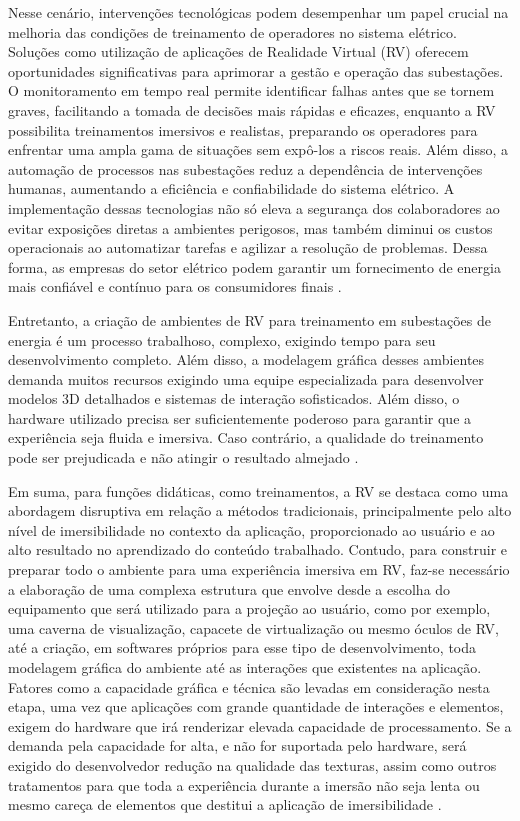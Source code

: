 Nesse cenário, intervenções tecnológicas podem desempenhar um papel crucial na melhoria das condições de treinamento de operadores no sistema elétrico. Soluções como utilização de aplicações de Realidade Virtual (RV) oferecem oportunidades significativas para aprimorar a gestão e operação das subestações. O monitoramento em tempo real permite identificar falhas antes que se tornem graves, facilitando a tomada de decisões mais rápidas e eficazes, enquanto a RV possibilita treinamentos imersivos e realistas, preparando os operadores para enfrentar uma ampla gama de situações sem expô-los a riscos reais. Além disso, a automação de processos nas subestações reduz a dependência de intervenções humanas, aumentando a eficiência e confiabilidade do sistema elétrico. A implementação dessas tecnologias não só eleva a segurança dos colaboradores ao evitar exposições diretas a ambientes perigosos, mas também diminui os custos operacionais ao automatizar tarefas e agilizar a resolução de problemas. Dessa forma, as empresas do setor elétrico podem garantir um fornecimento de energia mais confiável e contínuo para os consumidores finais \cite{zhou2016big}.

Entretanto, a criação de ambientes de RV para treinamento em subestações de energia é um processo trabalhoso, complexo, exigindo tempo para seu desenvolvimento completo. Além disso, a modelagem gráfica desses ambientes demanda muitos recursos exigindo uma equipe especializada para desenvolver modelos 3D detalhados e sistemas de interação sofisticados. Além disso, o hardware utilizado precisa ser suficientemente poderoso para garantir que a experiência seja fluida e imersiva. Caso contrário, a qualidade do treinamento pode ser prejudicada e não atingir o resultado almejado \cite{barreto2022proposta}.

Em suma, para funções didáticas, como treinamentos, a RV se destaca como uma abordagem disruptiva em relação a métodos tradicionais, principalmente pelo alto nível de imersibilidade no contexto da aplicação, proporcionado ao usuário e ao alto resultado no aprendizado do conteúdo trabalhado. Contudo, para construir e preparar todo o ambiente para uma experiência imersiva em RV, faz-se necessário a elaboração de uma complexa estrutura que envolve desde a escolha do equipamento que será utilizado para a projeção ao usuário, como por exemplo, uma caverna de visualização, capacete de virtualização ou mesmo óculos de RV, até a criação, em softwares próprios para esse tipo de desenvolvimento, toda modelagem gráfica do ambiente até as interações que existentes na aplicação. Fatores como a capacidade gráfica e técnica são levadas em consideração nesta etapa, uma vez que aplicações com grande quantidade de interações e elementos, exigem do hardware que irá renderizar elevada capacidade de processamento. Se a demanda pela capacidade for alta, e não for suportada pelo hardware, será exigido do desenvolvedor redução na qualidade das texturas, assim como outros tratamentos para que toda a experiência durante a imersão não seja lenta ou mesmo careça de elementos que destitui a aplicação de imersibilidade \cite{palmeira2020uncanny}. 

